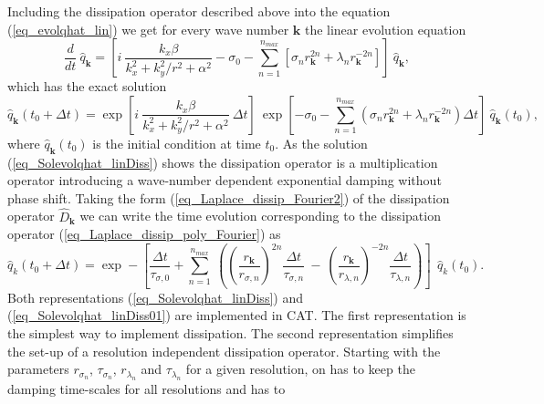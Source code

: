 Including the dissipation operator described above into the
equation (\ref{eq_evolqhat_lin}) we get for every wave number $\mathbf{k}$ 
the linear evolution equation
\begin{equation}  \label{eq_evolqhat_linDiss}
  \frac{d}{dt} \ \hat{q}_{\mathbf{k}}
   =
  \left[
   i \ \frac{k_{x} \beta}{k_{x}^{2} + k_{y}^{2}/r^{2} + \alpha^{2}} 
    -
   \sigma_{0} 
    -
   \sum_{n=1}^{n_{max}} 
    \left[
     \sigma_{n} r^{2n}_{\mathbf{k}}
      + 
     \lambda_{n} r^{-2n}_{\mathbf{k}}
    \right]
  \right] \ \hat{q}_{\mathbf{k}},
\end{equation}
which has the exact solution
\begin{equation} \label{eq_Solevolqhat_linDiss}
 \hat{q}_{\mathbf{k}}(t_{0} + \Delta t)
  = 
 \exp
  \left[
    i \ \frac{k_{x} \beta}{k_{x}^{2} + k_{y}^{2}/r^{2} + \alpha^{2}}
   \ \Delta t 
  \right] 
  \ 
 \exp
  \left[
    - \sigma_{0}
    - \sum_{n=1}^{n_{max}} 
       \left(
        \sigma_{n} r^{2n}_{\mathbf{k}}
          + 
        \lambda_{n} r^{-2n}_{\mathbf{k}}
       \right)
   \Delta t 
  \right] 
 \ \hat{q}_{\mathbf{k}}(t_{0}),
\end{equation}
where $\hat{q}_{\mathbf{k}}(t_{0})$ is the initial condition at time $t_{0}$. 
As the solution (\ref{eq_Solevolqhat_linDiss}) shows the dissipation operator 
is a multiplication operator introducing a wave-number dependent exponential 
damping without phase shift.
Taking the form (\ref{eq_Laplace_dissip_Fourier2})
of the dissipation operator $\hat{D}_{\mathbf{k}}$ we can write the
time evolution corresponding to the dissipation operator 
(\ref{eq_Laplace_dissip_poly_Fourier}) as
\begin{equation} \label{eq_Solevolqhat_linDiss01}
 \hat{q}_{k}(t_{0} + \Delta t) 
  =    
 \exp
 -\left[
   \frac{\Delta t}{\tau_{\sigma,0}}  
    +
    \sum_{n=1}^{n_{max}} \ 
     \left( 
      \left(\frac{r_{\mathbf{k}}}{r_{\sigma,n}} \right)^{2n}
      \frac{\Delta t}{\tau_{\sigma,n}}
      \ - \ \left( \frac{r_{\mathbf{k}}}{r_{\lambda,n}} \right)^{-2n}
      \frac{\Delta t}{\tau_{\lambda,n}}
     \right) 
  \right] 
    \ \
 \hat{q}_{k}(t_{0}).
\end{equation}
Both representations (\ref{eq_Solevolqhat_linDiss}) and 
(\ref{eq_Solevolqhat_linDiss01}) are implemented in CAT. 
The first representation is the simplest way to implement dissipation. 
The second representation simplifies the set-up of a resolution independent
dissipation operator.   Starting with the parameters 
$r_{\sigma_{n}}$, $\tau_{\sigma_{n}}$, $r_{\lambda_{n}}$ and 
$\tau_{\lambda_{n}}$ for a given resolution, on has to keep
the damping time-scales for all resolutions and has to            


